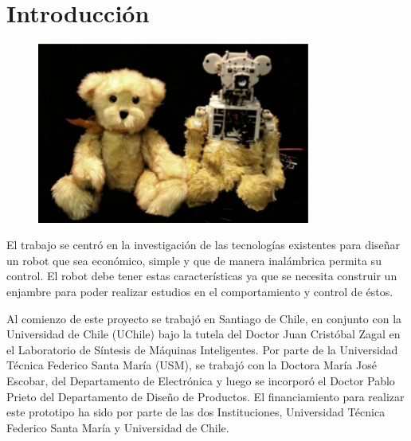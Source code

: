 
\chapter{Introducción} %

\label{Chapter1} %





\begin{figure}[htbp]
	\centering
		\includegraphics[width=0.8\textwidth]{./Figures/robot.jpg}
	\label{fig:Huggable}
\end{figure}

El trabajo se centró en la investigación de las tecnologías existentes para diseñar un robot que sea económico, simple y que de manera inalámbrica permita su control. El robot debe tener estas características ya que se necesita construir un enjambre para poder realizar estudios en el comportamiento y control de éstos.

Al comienzo de este proyecto se trabajó en Santiago de Chile, en conjunto con la Universidad de Chile (UChile) bajo la tutela del Doctor Juan Cristóbal Zagal en el Laboratorio de Síntesis de Máquinas Inteligentes. Por parte de la Universidad Técnica Federico Santa María (USM), se trabajó con la Doctora María José Escobar, del Departamento de Electrónica y luego se incorporó el Doctor Pablo Prieto del Departamento de Diseño de Productos. El financiamiento para realizar este prototipo ha sido por parte de las dos Instituciones, Universidad Técnica Federico Santa María y Universidad de Chile.

